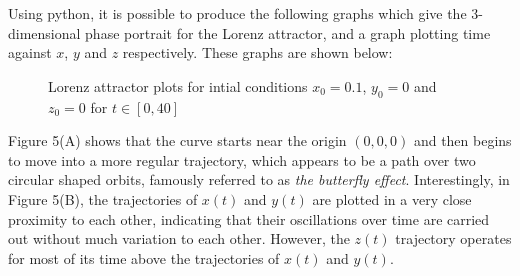 \documentclass[11pt,a4paper]{amsart}
\begin{document}
Using python, it is possible to produce the following graphs which give the 3- dimensional phase portrait for the Lorenz attractor, and a graph plotting time against $x$, $y$ and $z$ respectively. These graphs are shown below:
\begin{figure}[h]
\caption{Lorenz attractor plots for intial conditions $x_0=0.1$, $y_0=0$ and $z_0=0$ for $t\in[0,40]$}
\centering
{}
	\hfill
{}
\end{figure}

Figure 5(A) shows that the curve starts near the origin $(0,0,0)$ and then begins to move into a more regular trajectory, which appears to be a path over two circular shaped orbits, famously referred to as \textit{the butterfly effect}. Interestingly, in Figure 5(B), the trajectories of $x(t)$ and $y(t)$ are plotted in a very close proximity to each other, indicating that their oscillations over time are carried out without much variation to each other. However, the $z(t)$ trajectory operates for most of its time above the trajectories of $x(t)$ and $y(t)$.
\end{document}
